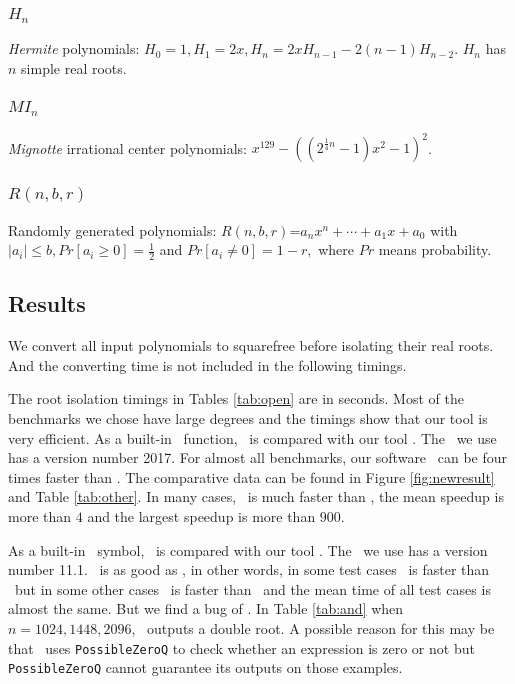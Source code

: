  \subsubsection{$H_n$}{\it Hermite } polynomials:  $H_0=1,H_1=2x,H_n=2xH_{n-1}-2(n-1)H_{n-2}$. $H_n$ has $n$ simple real roots.

 \subsubsection{$MI_n$} {\it Mignotte} irrational center polynomials: $x^{129}-((2^{\frac{1}{4}n}-1)x^2-1)^2$.


 \subsubsection{$R(n,b,r) $} Randomly generated polynomials: $R(n,b,r)$=$a_nx^n+\cdots+a_1x+a_0$ with $|a_i|\le b, Pr[a_i\ge 0]=\frac{1}{2}$ and  $Pr[a_i\neq 0] =1-r,$ where $Pr$ means probability.



 \subsection{Results}
We  convert all input polynomials to squarefree before isolating their real roots. And the converting time is not included in the following timings.

 The root isolation timings in Tables \ref{tab:open} are in seconds.  Most of the benchmarks we chose have large degrees and the timings show that our tool is very efficient.
As a  built-in  \MAPLE\ function, \REALROOT\ is    compared with  our tool \froot.
 	The   \MAPLE\  we use has a version number 2017.  For  almost all
 benchmarks, our  software \froot\  can be  four  times faster than \REALROOT. The comparative data can be found in Figure \ref{fig:newresult} and Table \ref{tab:other}. In many cases, \froot\ is much faster than \REALROOT, the mean speedup is more than $4$ and the largest speedup is more than $900$.


 As a  built-in \MM\ symbol, \inte\ is    compared with  our tool \froot. The  \MM\  we use has a version number 11.1. 
 	\froot\ is as good as \inte, in other words, in some test cases \froot\ is faster than \inte\ but in some other cases \inte\ is faster than \froot\ and the mean time of all test cases is  almost the same.
 	  But we find a bug of \MM. In Table \ref{tab:and} when $n=1024,1448,2096$, \inte\ outputs a double root. A possible reason for this may be that \inte\ uses {\tt PossibleZeroQ} to check whether an expression is zero or not but {\tt PossibleZeroQ} cannot guarantee its outputs on those examples.

